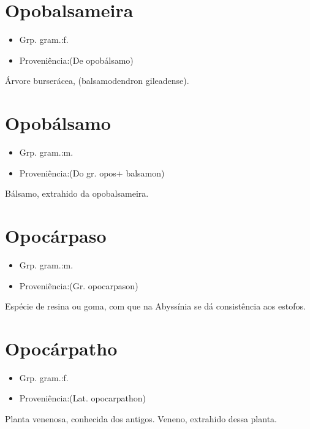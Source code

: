 \section{Opobalsameira}
\begin{itemize}
\item {Grp. gram.:f.}
\end{itemize}
\begin{itemize}
\item {Proveniência:(De \textunderscore opobálsamo\textunderscore )}
\end{itemize}
Árvore burserácea, (\textunderscore balsamodendron gileadense\textunderscore ).
\section{Opobálsamo}
\begin{itemize}
\item {Grp. gram.:m.}
\end{itemize}
\begin{itemize}
\item {Proveniência:(Do gr. \textunderscore opos\textunderscore  + \textunderscore balsamon\textunderscore )}
\end{itemize}
Bálsamo, extrahido da opobalsameira.
\section{Opocárpaso}
\begin{itemize}
\item {Grp. gram.:m.}
\end{itemize}
\begin{itemize}
\item {Proveniência:(Gr. \textunderscore opocarpason\textunderscore )}
\end{itemize}
Espécie de resina ou goma, com que na Abyssínia se dá consistência aos estofos.
\section{Opocárpatho}
\begin{itemize}
\item {Grp. gram.:f.}
\end{itemize}
\begin{itemize}
\item {Proveniência:(Lat. \textunderscore opocarpathon\textunderscore )}
\end{itemize}
Planta venenosa, conhecida dos antigos.
Veneno, extrahido dessa planta.
